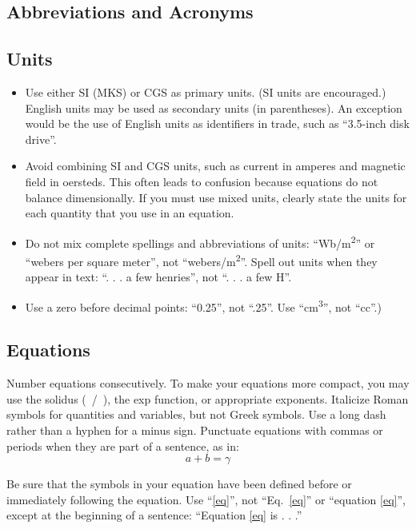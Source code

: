 \documentclass[conference]{IEEEtran}
\begin{document}
\subsection{Abbreviations and Acronyms}\label{AA}


\subsection{Units}
\begin{itemize}
\item Use either SI (MKS) or CGS as primary units. (SI units are encouraged.) English units may be used as secondary units (in parentheses). An exception would be the use of English units as identifiers in trade, such as ``3.5-inch disk drive''.
\item Avoid combining SI and CGS units, such as current in amperes and magnetic field in oersteds. This often leads to confusion because equations do not balance dimensionally. If you must use mixed units, clearly state the units for each quantity that you use in an equation.
\item Do not mix complete spellings and abbreviations of units: ``Wb/m\textsuperscript{2}'' or ``webers per square meter'', not ``webers/m\textsuperscript{2}''. Spell out units when they appear in text: ``. . . a few henries'', not ``. . . a few H''.
\item Use a zero before decimal points: ``0.25'', not ``.25''. Use ``cm\textsuperscript{3}'', not ``cc''.)
\end{itemize}

\subsection{Equations}
Number equations consecutively. To make your 
equations more compact, you may use the solidus (~/~), the exp function, or 
appropriate exponents. Italicize Roman symbols for quantities and variables, 
but not Greek symbols. Use a long dash rather than a hyphen for a minus 
sign. Punctuate equations with commas or periods when they are part of a 
sentence, as in:
\begin{equation}
a+b=\gamma\label{eq}
\end{equation}

Be sure that the 
symbols in your equation have been defined before or immediately following 
the equation. Use ``\eqref{eq}'', not ``Eq.~\eqref{eq}'' or ``equation \eqref{eq}'', except at 
the beginning of a sentence: ``Equation \eqref{eq} is . . .''
\end{document}
